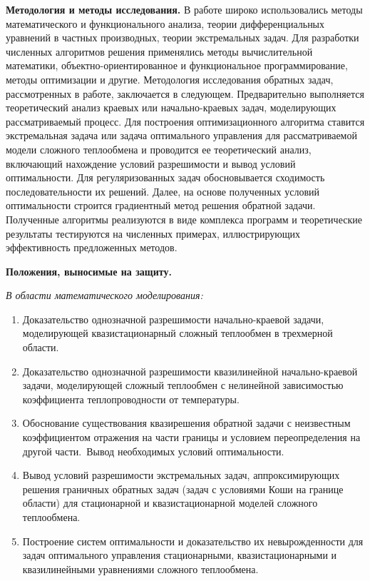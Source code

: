     \textbf{Методология и методы исследования.}
    В работе широко использовались методы математического и функционального анализа,
    теории дифференциальных уравнений в частных производных, теории экстремальных задач.
    Для разработки численных алгоритмов решения применялись методы
    вычислительной математики, объектно-ориентированное и функциональное
    программирование, методы оптимизации и другие.
    Методология исследования обратных задач, рассмотренных в работе,
    заключается в следующем.
    Предварительно выполняется теоретический анализ краевых или начально-краевых задач, моделирующих
    рассматриваемый процесс.
    Для построения оптимизационного алгоритма ставится экстремальная задача или задача
    оптимального управления для рассматриваемой модели сложного теплообмена и проводится ее
    теоретический анализ, включающий нахождение условий разрешимости и
    вывод условий оптимальности.
    Для регуляризованных задач обосновывается
    сходимость последовательности их решений.
    Далее, на основе полученных условий оптимальности
    строится градиентный метод решения обратной задачи.
    Полученные алгоритмы реализуются в виде комплекса программ и
    теоретические результаты тестируются на численных примерах,
    иллюстрирующих эффективность предложенных методов.


    \textbf{Положения, выносимые на защиту.}

    \textit{В области математического моделирования:}

    \begin{enumerate}[leftmargin=5.5mm]
        \item Доказательство однозначной разрешимости начально-краевой задачи,
        моделирующей квазистационарный сложный теплообмен в трехмерной
        области.
        \item Доказательство однозначной разрешимости квазилинейной начально-краевой задачи,
        моделирующей сложный теплообмен с нелинейной
        зависимостью коэффициента теплопроводности от температуры.
        \item Обоснование существования квазирешения обратной задачи с неизвестным
        коэффициентом отражения на части границы и условием переопределения на
        другой части.\ Вывод необходимых условий оптимальности.
        \item Вывод условий разрешимости экстремальных задач, аппроксимирующих
        решения граничных обратных задач (задач с условиями Коши на границе
        области) для стационарной и квазистационарной моделей сложного
        теплообмена.
        \item Построение систем оптимальности и доказательство их невырожденности
        для задач оптимального управления стационарными, квазистационарными и
        квазилинейными уравнениями сложного теплообмена.
        \setcounter{nameOfYourChoice}{\value{enumi}}
    \end{enumerate}

